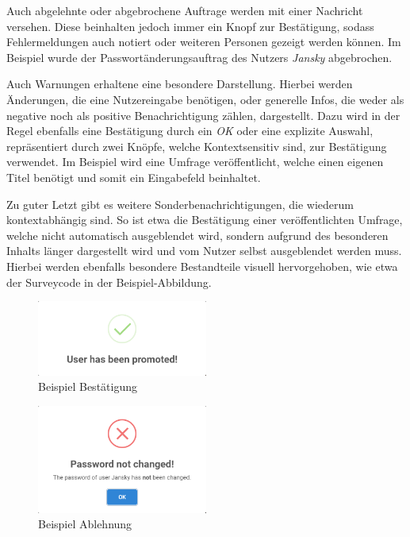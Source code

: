 Auch abgelehnte oder abgebrochene Auftrage werden mit einer Nachricht versehen.
Diese beinhalten jedoch immer ein Knopf zur Bestätigung, sodass Fehlermeldungen auch notiert oder weiteren Personen gezeigt werden können.
Im Beispiel  wurde der Passwortänderungsauftrag des Nutzers \emph{Jansky} abgebrochen.

Auch Warnungen erhaltene eine besondere Darstellung.
Hierbei werden Änderungen, die eine Nutzereingabe benötigen, oder generelle Infos, die weder als negative noch als positive Benachrichtigung zählen, dargestellt.
Dazu wird in der Regel ebenfalls eine Bestätigung durch ein \emph{OK} oder eine explizite Auswahl, repräsentiert durch zwei Knöpfe, welche Kontextsensitiv sind, zur Bestätigung verwendet.
Im Beispiel  wird eine Umfrage veröffentlicht, welche einen eigenen Titel benötigt und somit ein Eingabefeld beinhaltet.

Zu guter Letzt gibt es weitere Sonderbenachrichtigungen, die wiederum kontextabhängig sind.
So ist etwa \abb {} die Bestätigung einer veröffentlichten Umfrage, welche nicht automatisch ausgeblendet wird, sondern aufgrund des besonderen Inhalts länger dargestellt wird und vom Nutzer selbst ausgeblendet werden muss.
Hierbei werden ebenfalls besondere Bestandteile visuell hervorgehoben, wie etwa der Surveycode in der Beispiel-Abbildung.

\begin{figure}[H]
	\centering
	\includegraphics[width=0.5\textwidth, keepaspectratio]{img/guide/Angenommen.png}
	\captionsetup{justification=centering, format=plain}
	\caption[Beispiel Bestätigung]{Beispiel Bestätigung \\\quelleScreenshot}
	\label{fig:approve}
\end{figure}

\begin{figure}[H]
	\centering
	\includegraphics[width=0.5\textwidth, keepaspectratio]{img/guide/Abgelehnt.png}
	\captionsetup{justification=centering, format=plain}
	\caption[Beispiel Ablehnung]{Beispiel Ablehnung \\\quelleScreenshot}
	\label{fig:deny}
\end{figure}

